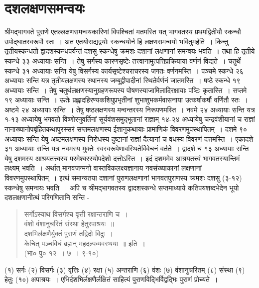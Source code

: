 {\section*{दशलक्षणसमन्वयः}

श्रीमद्भागवते पुराणे एतल्लक्षणसमन्वयकारिणां विपश्चितां मतमस्ति यत् भागवतस्य प्रथमद्वितीयौ स्कन्धौ उपोद्घातस्वरूपौ स्तः~। अत एतयोराद्यद्वयोः स्कन्धयोर्न हि लक्षणसमन्वयो भवितुमर्हति~। किन्तु तृतीयस्कन्धतो द्वादशस्कन्धपर्यन्तं दशसु स्कन्धेषु क्रमशः दशानां लक्षणानां समन्वयः भवति~। तथा हि तृतीये स्कन्धे ३३ अध्यायाः सन्ति~। तेषु सर्गस्य कारणसृष्टेः तत्त्वानामुत्पत्तिप्रक्रियाया वर्णनं विद्यते~। चतुर्थे स्कन्धे ३१ अध्यायाः सन्ति येषु विसर्गस्य कार्यसृष्टेश्चराचरस्य जगतः वर्णनमस्ति~। पञ्चमे स्कन्धे २६ अध्यायाः सन्ति यत्र तृतीयलक्षणस्य स्थानस्य जम्बूद्वीपादीनां स्थितेर्वर्णनं जातमस्ति~। षष्ठे स्कन्धे १९ अध्यायाः सन्ति~। तेषु चतुर्थलक्षणस्यानुग्रहणरूपस्य पोषणस्याजामिलादिरक्षायाः पष्टिः कृतास्ति~। सप्तमे १९ अध्यायाः सन्ति~। ऊतेः प्रह्लादहिरण्यकशिपुप्रभृतीनां शुभाशुभकर्मवासनाया उत्कर्षाकर्षौ वर्णितौ स्तः~। अष्टमे २४ अध्यायाः सन्ति~। तेषु षष्ठलक्षणस्य मन्वन्तरस्य निरूपणमस्ति~। नवमे २४ अध्यायाः सन्ति यत्र १-१३ अध्यायेषु भगवतो विष्णोरनुवर्तिनां सूर्यवंशसमुद्भूतानां राज्ञाम् १४-२४ अध्यायेषु चन्द्रवंशीयानां च राज्ञां नानाख्यानोपबृंहितकथापुरस्सरं सप्तमलक्षणस्य ईशानुकथायाः प्रामाणिकं विवरणमुपस्थापितम्~। दशमे ९० अध्यायाः सन्ति येषु अष्टमलक्षणस्य निरोधस्य दुष्टानां राज्ञां दैत्यानां च वधस्य विवरणं दत्तमस्ति~। एकादशे ३१ अध्यायाः सन्ति यत्र नवमस्य मुक्तेः स्वस्वरूपेणावस्थितेर्विवेचनं वर्तते~। द्वादशे च १३ अध्यायाः सन्ति येषु दशमस्य आश्रयतत्त्वस्य परमेश्वरस्योपदेशो दत्तोऽस्ति~। इदं दशममेव आश्रयतत्त्वं भागवतस्यान्तिमं लक्ष्यम् भवति~। अर्थात् मानवजन्मनो वास्तविकलक्ष्यज्ञानाय नवसंख्याकानां लक्षणानां विवरणमुपस्थापितम्~। इत्थं समान्यतया दशानां पुराणलक्षणानां भागवतपुराणस्य क्रमशः दशसु (३-१२) स्कन्धेषु समन्वयः भवति~। अपि च श्रीमद्भागवतस्य द्वादशस्कन्धे सप्तमाध्याये कतिपयशब्दभेदेन भूयो दशलक्षणानीत्थं परिगणितानि सन्ति -
\begin{verse}
सर्गोऽस्याथ विसर्गश्च वृत्ती रक्षान्तराणि च~। \\
वंशो वंशानुचरितं संस्था हेतुरपाश्रयः~॥\\
दशभिर्लक्षणैर्युक्तं पुराणं तद्विदो विदुः~। \\
केचित् पञ्चविधं ब्रह्मन् महदल्पव्यवस्थया~॥ इति~।\\
\hspace{5cm}(भा० पु० १२~। ७~। ९-१०)
\end{verse}
(१) सर्गः (२) विसर्गः (३) वृत्तिः (४) रक्षा (५) अन्तराणि (६) वंशः (७) वंशानुचरितम् (८) संस्था (९) हेतुः (१०) अपाश्रयः~। एभिर्दशभिर्लक्षणैर्लक्षितं साहित्यं पुराणविद्भिर्विद्वद्भिः पुराणं प्रोच्यते~। 

}
